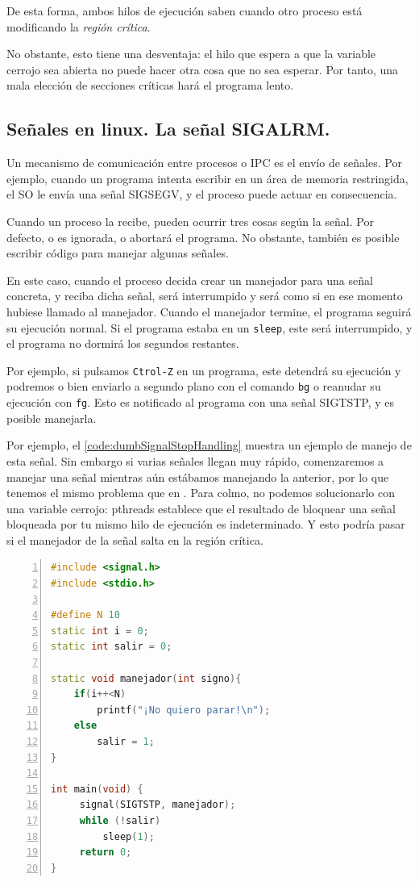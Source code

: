 De esta forma, ambos hilos de ejecución saben cuando otro proceso está modificando la \emph{región crítica}.

No obstante, esto tiene una desventaja: el hilo que espera a que la variable cerrojo sea abierta no puede hacer otra 
cosa que no sea esperar. Por tanto, una mala elección de secciones críticas hará el programa lento.

\subsection{Señales en linux. La señal SIGALRM.}
Un mecanismo de comunicación entre procesos o \gls{IPC} es el envío de señales. Por ejemplo, cuando un programa intenta 
escribir en un área de memoria restringida, el \gls{SO} le envía una señal \gls{SIGSEGV}, y el proceso puede actuar en 
consecuencia.

Cuando un proceso la recibe, pueden ocurrir tres cosas según la señal. Por defecto, o es ignorada, o abortará el 
programa. No obstante, también es posible escribir código para manejar algunas señales.

En este caso, cuando el proceso decida crear un manejador para una señal concreta, y reciba dicha señal, será 
interrumpido y será como si en ese momento hubiese llamado al manejador. Cuando el manejador termine, el programa 
seguirá su ejecución normal. Si el programa estaba en un \texttt{sleep}, este será interrumpido, y el programa no 
dormirá los segundos restantes.

Por ejemplo, si pulsamos \texttt{Ctrol-Z} en un programa, este detendrá su ejecución y podremos o bien enviarlo a 
segundo plano con el comando \texttt{bg} o reanudar su ejecución con \texttt{fg}. Esto es notificado al programa con 
una señal \gls{SIGTSTP}, y es posible manejarla.

Por ejemplo, el \lstlistingname{} \ref{code:dumbSignalStopHandling} muestra un ejemplo de manejo de esta señal. Sin 
embargo si varias señales llegan muy rápido, comenzaremos a manejar una señal mientras aún estábamos manejando la 
anterior, por lo que tenemos el mismo problema que en . Para colmo, no podemos solucionarlo 
con una variable cerrojo: \gls{pthreads} establece que el resultado de bloquear una señal bloqueada por tu mismo hilo 
de ejecución es indeterminado. Y esto podría pasar si el manejador de la señal salta en la región crítica.

\begin{lstlisting}[language=C++,caption={Manejo ingenuo de la señal \gls{SIGTSTP}}, 
breaklines=true, label=code:dumbSignalStopHandling,numbers=left,float=htbp]
#include <signal.h>
#include <stdio.h>

#define N 10
static int i = 0;
static int salir = 0;

static void manejador(int signo){
    if(i++<N)
        printf("¡No quiero parar!\n");
    else
        salir = 1;
}

int main(void) {
     signal(SIGTSTP, manejador);
     while (!salir)
         sleep(1);
     return 0;
}
\end{lstlisting}

